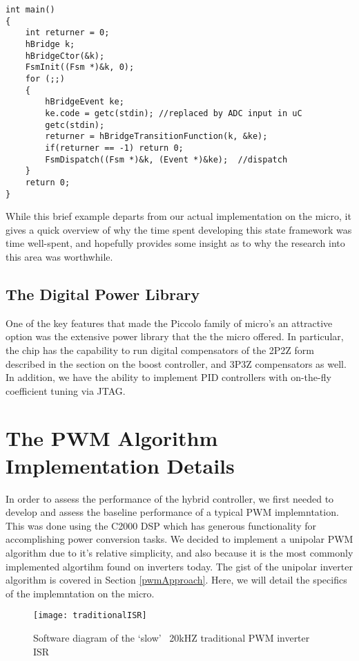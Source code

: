 \begin{lstlisting}
int main()
{
    int returner = 0;
    hBridge k;
    hBridgeCtor(&k);
    FsmInit((Fsm *)&k, 0);
    for (;;)
    {
        hBridgeEvent ke;                   
        ke.code = getc(stdin); //replaced by ADC input in uC           
        getc(stdin);                      
        returner = hBridgeTransitionFunction(k, &ke);
        if(returner == -1) return 0;
        FsmDispatch((Fsm *)&k, (Event *)&ke);  //dispatch
    }
    return 0;
}
\end{lstlisting}
\hfill \break
\hfill \break
 
While this brief example departs from our actual implementation on the micro, it gives a quick overview of why the time spent developing this state framework was time well-spent, and hopefully provides some insight as to why the research into this area was worthwhile.

\subsection{The Digital Power Library}
One of the key features that made the Piccolo family of micro's an attractive option was the extensive power library that the the micro offered. In particular, the chip has the capability to run digital compensators of the 2P2Z form described in the section on the boost controller, and 3P3Z compensators as well. In addition, we have the ability to implement PID controllers with on-the-fly coefficient tuning via JTAG.

\section{The PWM Algorithm Implementation Details}
In order to assess the performance of the hybrid controller, we first needed to develop and assess the baseline performance of a typical PWM implemntation. This was done using the C2000 DSP which has generous functionality for accomplishing power conversion tasks. We decided to implement a unipolar PWM algorithm due to it's relative simplicity, and also because it is the most commonly implemented algortihm found on inverters today. The gist of the unipolar inverter algorithm is covered in Section \ref{pwmApproach}. Here, we will detail the specifics of the implemntation on the micro.

\begin{figure}[h]
\begin{center}
\texttt{[image: traditionalISR]}
\caption{Software diagram of the `slow' ~20kHZ traditional PWM inverter ISR}
\label{slow}
\end{center}
\end{figure}

